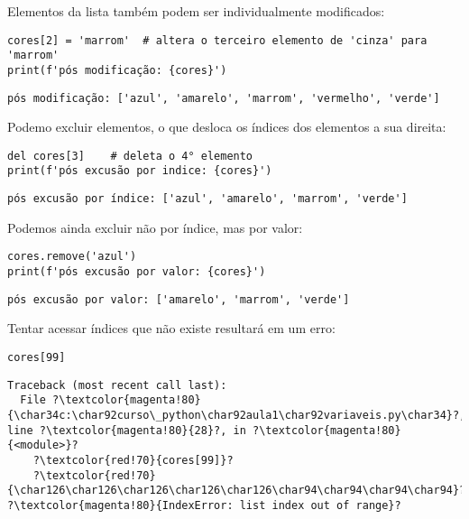 Elementos da lista também podem ser individualmente modificados:
\begin{verbatim}
cores[2] = 'marrom'  # altera o terceiro elemento de 'cinza' para 'marrom'
print(f'pós modificação: {cores}')
\end{verbatim}
\begin{verbatim}
pós modificação: ['azul', 'amarelo', 'marrom', 'vermelho', 'verde']
\end{verbatim}

Podemo excluir elementos, o que desloca os índices dos elementos a sua direita:
\begin{verbatim}
del cores[3]    # deleta o 4° elemento
print(f'pós excusão por indice: {cores}')
\end{verbatim}
\begin{verbatim}
pós excusão por índice: ['azul', 'amarelo', 'marrom', 'verde']
\end{verbatim}

Podemos ainda excluir não por índice, mas por valor:
\begin{verbatim}
cores.remove('azul')
print(f'pós excusão por valor: {cores}')
\end{verbatim}
\begin{verbatim}
pós excusão por valor: ['amarelo', 'marrom', 'verde']
\end{verbatim}

Tentar acessar índices que não existe resultará em um erro:
\begin{verbatim}
cores[99]
\end{verbatim}
\begin{verbatim}
Traceback (most recent call last):
  File ?\textcolor{magenta!80}{\char34c:\char92curso\_python\char92aula1\char92variaveis.py\char34}?, line ?\textcolor{magenta!80}{28}?, in ?\textcolor{magenta!80}{<module>}?
    ?\textcolor{red!70}{cores[99]}?
    ?\textcolor{red!70}{\char126\char126\char126\char126\char126\char94\char94\char94\char94}?
?\textcolor{magenta!80}{IndexError: list index out of range}?
\end{verbatim}

